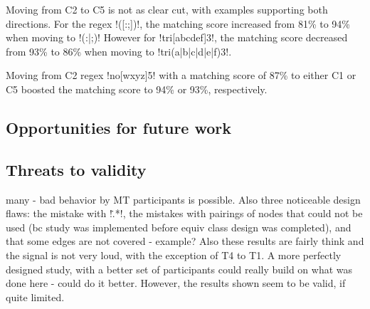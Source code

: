 {Moving from C2 to C5 is not as clear cut, with examples supporting both directions.  For the regex \cverb!([:;])!, the matching score increased from 81\% to 94\% when moving to \cverb!(:|;)!  However for \cverb!tri[abcdef]3!, the matching score decreased from 93\% to 86\% when moving to \cverb!tri(a|b|c|d|e|f)3!.

Moving from C2 regex \cverb!no[wxyz]5! with a matching score of 87\% to either C1 or C5 boosted the matching score to 94\% or 93\%, respectively.


\subsection{Opportunities for future work}


\subsection{Threats to validity}
many - bad behavior by MT participants is possible.  Also three noticeable design flaws: the mistake with \cverb!\..*!, the mistakes with pairings of nodes that could not be used (bc study was implemented before equiv class design was completed), and that some edges are not covered - example?
Also these results are fairly think and the signal is not very loud, with the exception of T4 to T1.  A more perfectly designed study, with a better set of participants could really build on what was done here - could do it better.  However, the results shown seem to be valid, if quite limited.






}
